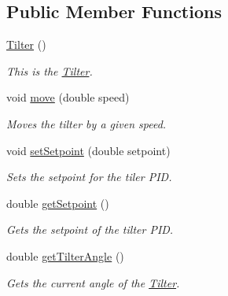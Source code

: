 \subsection*{Public Member Functions}
\begin{DoxyCompactItemize}
\item 
\mbox{\label{classfrc_1_1robot_1_1subsystems_1_1_tilter_ac100673eaa18ac096df558d73764e3c7}} 
\mbox{\hyperlink{classfrc_1_1robot_1_1subsystems_1_1_tilter_ac100673eaa18ac096df558d73764e3c7}{Tilter}} ()
\begin{DoxyCompactList}\small\item\em This is the \mbox{\hyperlink{classfrc_1_1robot_1_1subsystems_1_1_tilter}{Tilter}}. \end{DoxyCompactList}\item 
void \mbox{\hyperlink{classfrc_1_1robot_1_1subsystems_1_1_tilter_aff055a0f0a130556cd17d63ecdac2b55}{move}} (double speed)
\begin{DoxyCompactList}\small\item\em Moves the tilter by a given speed. \end{DoxyCompactList}\item 
void \mbox{\hyperlink{classfrc_1_1robot_1_1subsystems_1_1_tilter_a70893e12c662ea63ee1ebf3be8704b5f}{set\+Setpoint}} (double setpoint)
\begin{DoxyCompactList}\small\item\em Sets the setpoint for the tiler P\+ID. \end{DoxyCompactList}\item 
double \mbox{\hyperlink{classfrc_1_1robot_1_1subsystems_1_1_tilter_a4dc4274fb03337dcb95357f4d06df005}{get\+Setpoint}} ()
\begin{DoxyCompactList}\small\item\em Gets the setpoint of the tilter P\+ID. \end{DoxyCompactList}\item 
double \mbox{\hyperlink{classfrc_1_1robot_1_1subsystems_1_1_tilter_a377eacbf4c90453791d61f76af3d68cf}{get\+Tilter\+Angle}} ()
\begin{DoxyCompactList}\small\item\em Gets the current angle of the \mbox{\hyperlink{classfrc_1_1robot_1_1subsystems_1_1_tilter}{Tilter}}. \end{DoxyCompactList}\item 
\mbox{\label{classfrc_1_1robot_1_1subsystems_1_1_tilter_aaeae2a3c8c66df3699be87fbb0ede775}} 

\end{DoxyCompactItemize}
